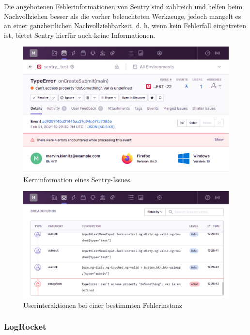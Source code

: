 Die angebotenen Fehlerinformationen von Sentry sind zahlreich und helfen beim Nachvollziehen besser als die vorher beleuchteten Werkzeuge, jedoch mangelt es an einer ganzheitlichen Nachvollziehbarkeit, d. h. wenn kein Fehlerfall eingetreten ist, bietet Sentry hierfür auch keine Informationen.

\begin{figure}[H]
	\centering
	\includegraphics[width=\linewidth]{img/03_methoden/sentry_issue-details.png}
	\caption{Kerninformation eines Sentry-Issues}
	\label{fig:sentry_issue-details}
\end{figure}

\begin{figure}[H]
	\centering
	\includegraphics[width=\linewidth]{img/03_methoden/sentry_issue-event-breadcrumbs.png}
	\caption{Userinteraktionen bei einer bestimmten Fehlerinstanz}
	\label{fig:sentry_issue-event-breadcrumbs}
\end{figure}

\subsubsection{LogRocket}

